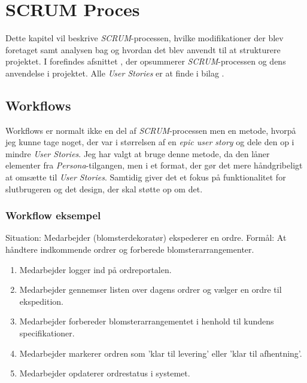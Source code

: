 \chapter{SCRUM Proces}
\label{chapter:scrum}
Dette kapitel vil beskrive \emph{SCRUM}-processen, hvilke modifikationer der blev foretaget samt analysen bag og hvordan det blev anvendt til at strukturere projektet. 
I  forefindes afsnittet , der opsummerer \emph{SCRUM}-processen og dens anvendelse i projektet.
Alle \emph{User Stories} er at finde i bilag .

\section{Workflows}
Workflows er normalt ikke en del af \emph{SCRUM}-processen men en metode, hvorpå jeg kunne tage noget, der var i størrelsen af en \emph{epic user story} og dele den op i mindre \emph{User Stories}. 
Jeg har valgt at bruge denne metode, da den låner elementer fra \emph{Persona}-tilgangen, men i et format, der gør det mere håndgribeligt at omsætte til \emph{User Stories}.
Samtidig giver det et fokus på funktionalitet for slutbrugeren og det design, der skal støtte op om det.

\subsection{Workflow eksempel}
Situation: Medarbejder (blomsterdekoratør) ekspederer en ordre.
Formål: At håndtere indkommende ordrer og forberede blomsterarrangementer.
\begin{enumerate}
    \item Medarbejder logger ind på ordreportalen.
    \item Medarbejder gennemser listen over dagens ordrer og vælger en ordre til ekspedition.
    \item Medarbejder forbereder blomsterarrangementet i henhold til kundens specifikationer.
    \item Medarbejder markerer ordren som 'klar til levering' eller 'klar til afhentning'.
    \item Medarbejder opdaterer ordrestatus i systemet.
    \label{item:workflow-eksempel}
\end{enumerate}


